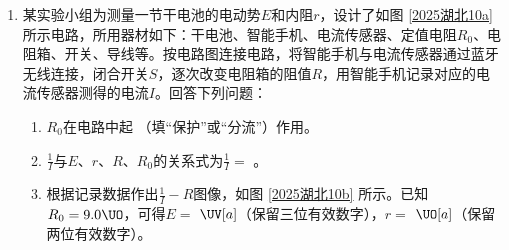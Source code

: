 \documentclass[\gkver]{gaokaozhenti}
\begin{document}
\begin{enumerate}
{方向与$ x $轴负方向成$ 18 \degree $夹角斜向下}
{大小为$\frac{2kq}{R^2} ( \cos 54 \degree + \cos 18 \degree ) $}
{大小为$\frac{2kq}{R^{2}} (2 \cos 54 \degree + \cos 18 \degree ) $}


\item
某实验小组为测量一节干电池的电动势$ E $和内阻$ r $，设计了如图 \ref{2025湖北10a} 所示电路，所用器材如下：干电池、智能手机、电流传感器、定值电阻$ R_{0} $、电阻箱、开关、导线等。按电路图连接电路，将智能手机与电流传感器通过蓝牙无线连接，闭合开关$ S $，逐次改变电阻箱的阻值$ R $，用智能手机记录对应的电流传感器测得的电流$ I $。回答下列问题：

\begin{enumerate}
\item
$ R_{0} $在电路中起  （填“保护”或“分流”）作用。

\item 
$\frac{1}{I}$与$ E $、$ r $、$ R $、$ R_{0} $的关系式为$ \frac{1}{I}= $  。

\item 
根据记录数据作出$\frac{1}{I} - R $图像，如图 \ref{2025湖北10b} 所示。已知$ R_{0} =9.0 \UO $，可得$ E=$  $ \UV[a] $（保留三位有效数字），$ r= $  $\UO[a] $（保留两位有效数字）。



\end{enumerate}
\end{enumerate}
\end{document}
